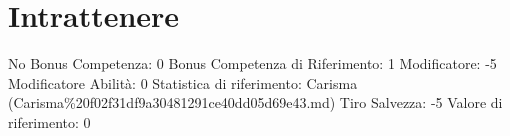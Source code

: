 \section{Intrattenere}\label{intrattenere}

\begin{description}
\tightlist
\item[Tags: ABI]
No Bonus Competenza: 0 Bonus Competenza di Riferimento: 1 Modificatore:
-5 Modificatore Abilità: 0 Statistica di riferimento: Carisma
(Carisma\%20f02f31df9a30481291ce40dd05d69e43.md) Tiro Salvezza: -5
Valore di riferimento: 0
\end{description}
